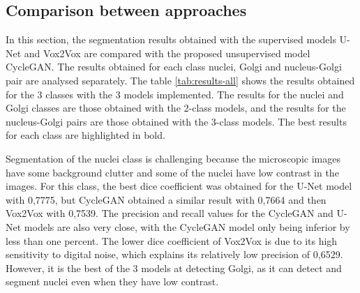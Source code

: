 \subsection{Comparison between approaches}

In this section, the segmentation results obtained with the supervised models U-Net and Vox2Vox are compared with the proposed unsupervised model CycleGAN. The results obtained for each class nuclei, Golgi and nucleus-Golgi pair are analysed separately. The table \ref{tab:results-all} shows the results obtained for the 3 classes with the 3 models implemented. The results for the nuclei and Golgi classes are those obtained with the 2-class models, and the results for the nucleus-Golgi pairs are those obtained with the 3-class models. The best results for each class are highlighted in bold.

\begin{table}[!htb]
  \centering
  \caption{Average metric values obtained for the three different models implemented}
  \label{tab:results-all}
  \renewcommand\arraystretch{1.4}
  \end{table}

Segmentation of the nuclei class is challenging because the microscopic images have some background clutter and some of the nuclei have low contrast in the images. For this class, the best dice coefficient was obtained for the U-Net model with 0,7775, but CycleGAN obtained a similar result with 0,7664 and then Vox2Vox with 0,7539. The precision and recall values for the CycleGAN and U-Net models are also very close, with the CycleGAN model only being inferior by less than one percent. The lower dice coefficient of Vox2Vox is due to its high sensitivity to digital noise, which explains its relatively low precision of 0,6529. However, it is the best of the 3 models at detecting Golgi, as it can detect and segment nuclei even when they have low contrast.

